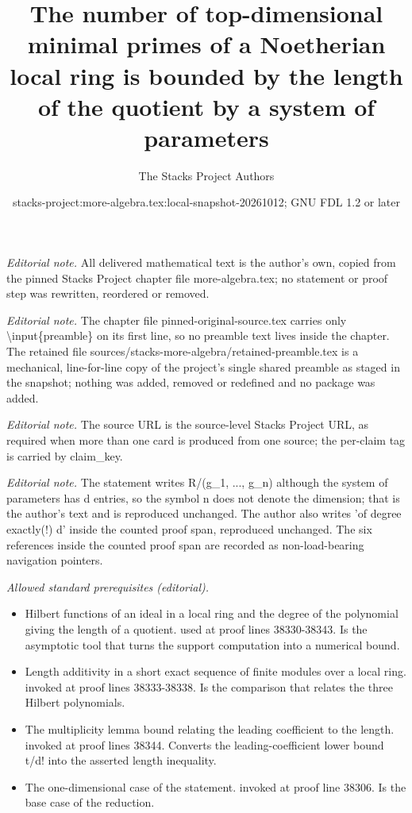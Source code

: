 \documentclass[10pt,a4paper]{amsart}
\title{The number of top-dimensional minimal primes of a Noetherian local ring is bounded by the length of the quotient by a system of parameters}
\author{The Stacks Project Authors}
\date{stacks-project:more-algebra.tex:local-snapshot-20261012; GNU FDL 1.2 or later}
\theoremstyle{plain}
\theoremstyle{definition}
\theoremstyle{remark}
\numberwithin{equation}{subsection}
\begin{document}
\maketitle
\setcounter{subsection}{1}
\noindent\textit{Editorial note.} All delivered mathematical text is the author's own, copied from the pinned Stacks Project chapter file more-algebra.tex; no statement or proof step was rewritten, reordered or removed.\par\medskip
\noindent\textit{Editorial note.} The chapter file pinned-original-source.tex carries only \textbackslash{}input\{preamble\} on its first line, so no preamble text lives inside the chapter. The retained file sources/stacks-more-algebra/retained-preamble.tex is a mechanical, line-for-line copy of the project's single shared preamble as staged in the snapshot; nothing was added, removed or redefined and no package was added.\par\medskip
\noindent\textit{Editorial note.} The source URL is the source-level Stacks Project URL, as required when more than one card is produced from one source; the per-claim tag is carried by claim\_key.\par\medskip
\noindent\textit{Editorial note.} The statement writes R/(g\_1, ..., g\_n) although the system of parameters has d entries, so the symbol n does not denote the dimension; that is the author's text and is reproduced unchanged. The author also writes 'of degree exactly(!) d' inside the counted proof span, reproduced unchanged. The six references inside the counted proof span are recorded as non-load-bearing navigation pointers.\par\medskip
\noindent\textit{Allowed standard prerequisites (editorial).}\begin{itemize}
\item Hilbert functions of an ideal in a local ring and the degree of the polynomial giving the length of a quotient. used at proof lines 38330-38343. Is the asymptotic tool that turns the support computation into a numerical bound.
\item Length additivity in a short exact sequence of finite modules over a local ring. invoked at proof lines 38333-38338. Is the comparison that relates the three Hilbert polynomials.
\item The multiplicity lemma bound relating the leading coefficient to the length. invoked at proof lines 38344. Converts the leading-coefficient lower bound t/d! into the asserted length inequality.
\item The one-dimensional case of the statement. invoked at proof line 38306. Is the base case of the reduction.
\end{itemize}\medskip
\end{document}
